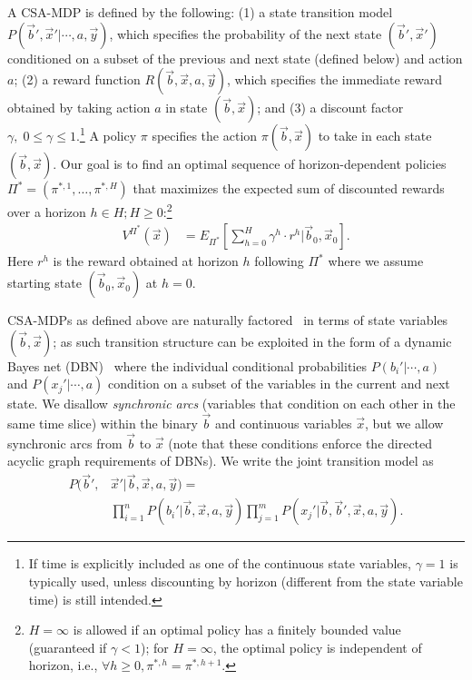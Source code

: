 \documentclass[letterpaper]{article}
\begin{document}
A CSA-MDP is defined by the following: (1) a state transition model
$P(\vec{b}',\vec{x}'|\cdots,a,\vec{y})$, which specifies the probability of
the next state $(\vec{b}',\vec{x}')$ conditioned on a subset of the
previous and next state (defined below) and action $a$; (2) a reward
function $R(\vec{b},\vec{x},a,\vec{y})$, which specifies the immediate reward
obtained by taking action $a$ in state $(\vec{b},\vec{x})$; and (3) a
discount factor $\gamma, \; 0 \leq \gamma \leq 1$.\footnote{If time is
explicitly included as one of the continuous state variables, $\gamma
= 1$ is typically used, unless discounting by horizon (different from
the state variable time) is still intended.}  
A policy $\pi$
specifies the action $\pi(\vec{b},\vec{x})$ to take in each state
$(\vec{b},\vec{x})$.  Our goal is to find an optimal sequence of
horizon-dependent policies $\Pi^* = (\pi^{*,1},\ldots,\pi^{*,H})$
that maximizes the expected sum of discounted rewards over a horizon
$h \in H; H \geq 0$:\footnote{$H=\infty$ is allowed if an optimal policy has a
finitely bounded value (guaranteed if $\gamma < 1$); for $H=\infty$, 
the optimal policy is independent of horizon, 
i.e., $\forall h \geq 0, \pi^{*,h} = \pi^{*,h+1}$.}
\begin{align}
V^{\Pi^*}(\vec{x}) & = E_{\Pi^*} \left[ \sum_{h=0}^{H} \gamma^h \cdot r^h \Big| \vec{b}_0,\vec{x}_0 \right]. \label{eq:vfun_def}
\end{align}
Here $r^h$ is the reward obtained at horizon $h$ following $\Pi^*$ where 
we assume starting state $(\vec{b}_0,\vec{x}_0)$ at $h=0$.
 
CSA-MDPs as defined above are naturally factored~\cite{boutilier99dt}
in terms of state variables $(\vec{b},\vec{x})$; as such transition
structure can be exploited in the form of a dynamic Bayes net
(DBN)~\cite{dbn} where the individual conditional probabilities
$P(b_i'|\cdots,a)$ and $P(x_j'|\cdots,a)$ condition on a subset of the
variables in the current and next state.  We disallow \emph{synchronic
arcs} (variables that condition on each other in the same time slice) 
within the binary $\vec{b}$ and continuous variables $\vec{x}$, 
but we allow synchronic arcs from $\vec{b}$ to $\vec{x}$ (note that
these conditions enforce the directed acyclic graph requirements of
DBNs).
We write the joint transition model as
\begin{align}
P(\vec{b}',&\vec{x}'|\vec{b},\vec{x},a,\vec{y}) = \label{eq:dbn} \\
& \prod_{i=1}^n P(b_i'|\vec{b},\vec{x},a,\vec{y}) \prod_{j=1}^m P(x_j'|\vec{b},\vec{b}',\vec{x},a,\vec{y}). \nonumber 
\end{align}
\end{document}
